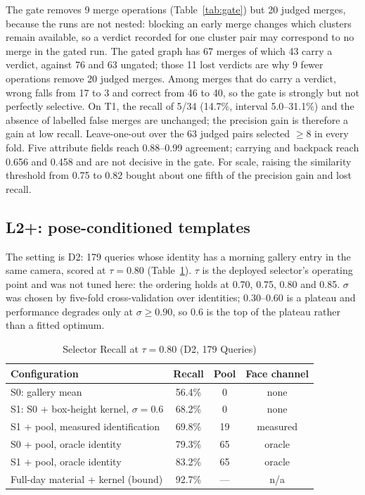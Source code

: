\documentclass[journal]{IEEEtran}
\begin{document}
The gate removes 9 merge operations (Table~\ref{tab:gate}) but 20 judged merges, because the runs are not nested: blocking an early merge changes which clusters remain available, so a verdict recorded for one cluster pair may correspond to no merge in the gated run. The gated graph has 67 merges of which 43 carry a verdict, against 76 and 63 ungated; those 11 lost verdicts are why 9 fewer operations remove 20 judged merges. Among merges that do carry a verdict, wrong falls from 17 to 3 and correct from 46 to 40, so the gate is strongly but not perfectly selective. On T1, the recall of 5/34 (14.7\%, interval 5.0--31.1\%) and the absence of labelled false merges are unchanged; the precision gain is therefore a gain at low recall. Leave-one-out over the 63 judged pairs selected $\ge 8$ in every fold. Five attribute fields reach 0.88--0.99 agreement; carrying and backpack reach 0.656 and 0.458 and are not decisive in the gate. For scale, raising the similarity threshold from 0.75 to 0.82 bought about one fifth of the precision gain and lost recall.

\subsection{L2+: pose-conditioned templates}
The setting is D2: 179 queries whose identity has a morning gallery entry in the same camera, scored at $\tau = 0.80$ (Table~\ref{tab:selector}). $\tau$ is the deployed selector's operating point and was not tuned here: the ordering holds at 0.70, 0.75, 0.80 and 0.85. $\sigma$ was chosen by five-fold cross-validation over identities; 0.30--0.60 is a plateau and performance degrades only at $\sigma \ge 0.90$, so 0.6 is the top of the plateau rather than a fitted optimum.

\begin{table}[t]
\caption{Selector Recall at $\tau = 0.80$ (D2, 179 Queries)}\label{tab:selector}
\centering
\setlength{\tabcolsep}{4pt}
\begin{tabular}{@{}lccc@{}}
\toprule
Configuration & Recall & Pool & Face channel\\
\midrule
S0: gallery mean & 56.4\% & 0 & none\\
S1: S0 + box-height kernel, $\sigma = 0.6$ & 68.2\% & 0 & none\\
S1 + pool, measured identification & 69.8\% & 19 & measured\\
S0 + pool, oracle identity & 79.3\% & 65 & oracle\\
S1 + pool, oracle identity & 83.2\% & 65 & oracle\\
Full-day material + kernel (bound) & 92.7\% & --- & n/a\\
\bottomrule
\end{tabular}
\end{table}
\end{document}

